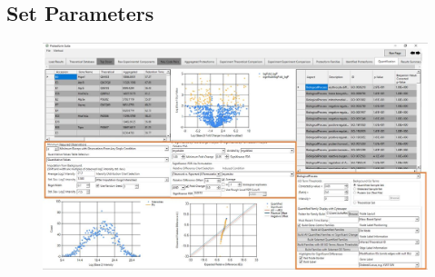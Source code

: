 \subsection{Set Parameters}
\begin{figure}[h]
\centering
\includegraphics[scale=0.43]{figures/quant1.jpg}
\end{figure}
